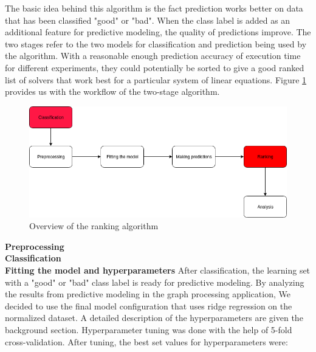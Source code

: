 The basic idea behind this algorithm is the fact prediction works better on data that has been classified "good" or "bad". When the class label is added as an additional feature for predictive modeling, the quality of predictions improve. The two stages refer to the two models for classification and prediction being used by the algorithm. With a reasonable enough prediction accuracy of execution time for different experiments, they could potentially be sorted to give a good ranked list of solvers that work best for a particular system of linear equations. Figure \ref{Overview of the ranking algorithm} provides us with the workflow of the two-stage algorithm.


\begin{figure}
    \centering
    \includegraphics[width=1\columnwidth]{figures/ranking_overview.png}
    \caption{Overview of the ranking algorithm}
    \label{Overview of the ranking algorithm}
\end{figure}

\textbf{Preprocessing}\\
\textbf{Classification}\\

\textbf{Fitting the model and hyperparameters}
After classification, the learning set with a "good" or "bad" class label is ready for predictive modeling. By analyzing the results from predictive modeling in the graph processing application, We decided to use the final model configuration that uses ridge regression on the normalized dataset. A detailed description of the hyperparameters are given the background section. Hyperparameter tuning was done with the help of 5-fold cross-validation. After tuning, the best set values for hyperparameters were:\\

